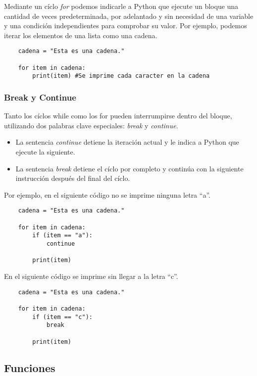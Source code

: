 \documentclass[12pt]{article}
\begin{document}
    Mediante un cíclo \textit{for} podemos indicarle a Python que ejecute un bloque una cantidad de veces predeterminada,
    por adelantado y sin necesidad de una variable y una condición independientes para comprobar su valor.
    Por ejemplo, podemos iterar los elementos de una lista como una cadena.

    \begin{lstlisting}
    cadena = "Esta es una cadena."

    for item in cadena:
        print(item) #Se imprime cada caracter en la cadena
    \end{lstlisting}

    \subsubsection{Break y Continue}

    Tanto los cíclos while como los for pueden interrumpirse dentro del bloque, utilizando dos palabras clave especiales: \textit{break} y \textit{continue}.
    \begin{itemize}
        \item La sentencia \textit{continue} detiene la iteración actual y le indica a Python que ejecute la siguiente.
        \item La sentencia \textit{break} detiene el cíclo por completo y continúa con la siguiente instrucción después del final del cíclo.
    \end{itemize}

    Por ejemplo, en el siguiente código no se imprime ninguna letra ``a''.
    \begin{lstlisting}
    cadena = "Esta es una cadena."

    for item in cadena:
        if (item == "a"):
            continue

        print(item)
    \end{lstlisting}

    En el siguiente código se imprime sin llegar a la letra ``c''.
    \begin{lstlisting}
    cadena = "Esta es una cadena."

    for item in cadena:
        if (item == "c"):
            break

        print(item)
    \end{lstlisting}


    \subsection{Funciones}
\end{document}
